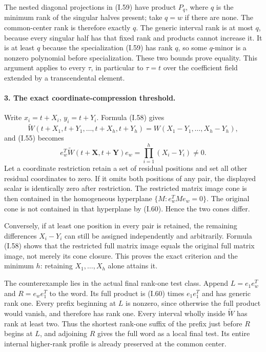 The nested diagonal projections in (I.59) have product
$P_q$, where $q$ is the minimum rank of the singular halves
present; take $q=w$ if there are none. The common-center rank
is therefore exactly $q$. The generic interval rank is at
most $q$, because every singular half has that fixed rank
and products cannot increase it. It is at least $q$ because
the specialization (I.59) has rank $q$, so some $q$-minor is
a nonzero polynomial before specialization. These two bounds
prove equality. This argument applies to every $\tau$, in
particular to $\tau=t$ over the coefficient field extended
by a transcendental element.

\paragraph{3. The exact coordinate-compression threshold.}
Write $x_i=t+X_i$, $y_i=t+Y_i$. Formula (I.58) gives
\[
 \widetilde W(t+X_1,t+Y_1,\ldots,t+X_h,t+Y_h)
     =W(X_1-Y_1,\ldots,X_h-Y_h),
\]
and (I.55) becomes
\[
 e_w^T\widetilde W(t+\mathbf X,t+\mathbf Y)e_w
       =\prod_{i=1}^h(X_i-Y_i)\ne0.
 \tag{I.60}
\]
Let a coordinate restriction retain a set of residual positions
and set all other residual coordinates to zero. If it omits
both positions of any pair, the displayed scalar is identically
zero after restriction. The restricted matrix image cone is
then contained in the homogeneous hyperplane
$\{M:e_w^TMe_w=0\}$. The original cone is not contained in
that hyperplane by (I.60). Hence the two cones differ.

Conversely, if at least one position in every pair is retained,
the remaining differences $X_i-Y_i$ can still be assigned
independently and arbitrarily. Formula (I.58) shows that the
restricted full matrix image equals the original full matrix
image, not merely its cone closure. This proves the exact
criterion and the minimum $h$: retaining $X_1,\ldots,X_h$
alone attains it.

The counterexample lies in the actual final rank-one test
class. Append $L=e_1e_w^T$ and $R=e_we_1^T$ to the word.
Its full product is (I.60) times $e_1e_1^T$ and has generic
rank one. Every prefix beginning at $L$ is nonzero, since
otherwise the full product would vanish, and therefore has
rank one. Every interval wholly inside $\widetilde W$ has
rank at least two. Thus the shortest rank-one suffix of the
prefix just before $R$ begins at $L$, and adjoining $R$
gives the full word as a local final test. Its entire internal
higher-rank profile is already preserved at the common center.

